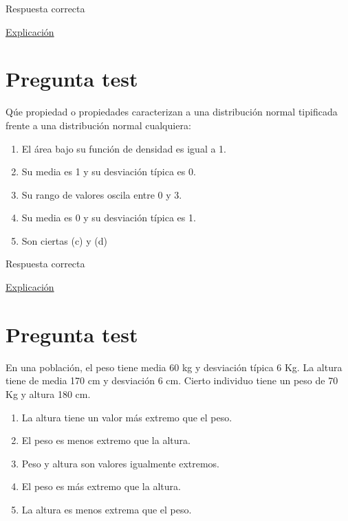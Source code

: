 \documentclass[
]{book}
\providecommand{\tightlist}{%
  \setlength{\itemsep}{0pt}\setlength{\parskip}{0pt}}
\begin{document}
Respuesta correcta

\href{https://homepage.divms.uiowa.edu/~mbognar/}{Explicación}

\hypertarget{pregunta-test-101}{%
\section{Pregunta test}\label{pregunta-test-101}}

Qúe propiedad o propiedades caracterizan a una distribución normal tipificada frente a una distribución normal cualquiera:

\begin{enumerate}
\def\labelenumi{\alph{enumi})}
\tightlist
\item
  El área bajo su función de densidad es igual a 1.
\item
  Su media es 1 y su desviación típica es 0.
\item
  Su rango de valores oscila entre 0 y 3.
\item
  Su media es 0 y su desviación típica es 1.
\item
  Son ciertas (c) y (d)
\end{enumerate}

Respuesta correcta

\href{https://1fjmanzano.github.io/bioestadistica/distribuciones-de-probabilidad.html\#distribucio\%CC\%81n-z}{Explicación}

\hypertarget{pregunta-test-102}{%
\section{Pregunta test}\label{pregunta-test-102}}

En una población, el peso tiene media 60 kg y desviación típica 6 Kg. La altura tiene de media 170 cm y desviación 6 cm. Cierto individuo tiene un peso de 70 Kg y altura 180 cm.

\begin{enumerate}
\def\labelenumi{\alph{enumi})}
\tightlist
\item
  La altura tiene un valor más extremo que el peso.
\item
  El peso es menos extremo que la altura.
\item
  Peso y altura son valores igualmente extremos.
\item
  El peso es más extremo que la altura.
\item
  La altura es menos extrema que el peso.
\end{enumerate}
\end{document}

